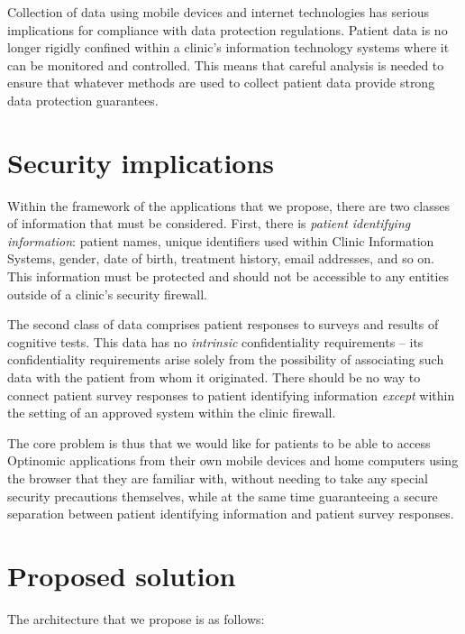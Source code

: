 \documentclass[DIV=calc,paper=a4,fontsize=11pt,twocolumn]{scrartcl}
\begin{document}
Collection of data using mobile devices and internet technologies has
serious implications for compliance with data protection regulations.
Patient data is no longer rigidly confined within a clinic's
information technology systems where it can be monitored and
controlled.  This means that careful analysis is needed to ensure that
whatever methods are used to collect patient data provide strong data
protection guarantees.


\section*{Security implications}

Within the framework of the applications that we propose, there are
two classes of information that must be considered.  First, there is
\emph{patient identifying information}: patient names, unique
identifiers used within Clinic Information Systems, gender, date of
birth, treatment history, email addresses, and so on.  This
information must be protected and should not be accessible to any
entities outside of a clinic's security firewall.

The second class of data comprises patient responses to surveys and
results of cognitive tests.  This data has no \emph{intrinsic}
confidentiality requirements -- its confidentiality requirements arise
solely from the possibility of associating such data with the patient
from whom it originated.  There should be no way to connect patient
survey responses to patient identifying information \emph{except}
within the setting of an approved system within the clinic firewall.

The core problem is thus that we would like for patients to be able to
access Optinomic applications from their own mobile devices and home
computers using the browser that they are familiar with, without
needing to take any special security precautions themselves, while at
the same time guaranteeing a secure separation between patient
identifying information and patient survey responses.


\section*{Proposed solution}

The architecture that we propose is as follows:
\end{document}
